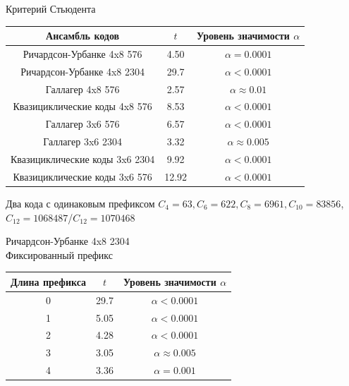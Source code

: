 \documentclass[t,13pt,graphics=pdflatex,xcolor=table,aspectratio=43]{beamer}
\begin{document}
\begin{frame}{Критерий Стьюдента}
\begin{center}
\begin{tabular}{|c|c|c|}
	\hline
	Ансамбль кодов & $t$ & Уровень значимости $\alpha$\\
	\hline
	Ричардсон-Урбанке 4x8 576 & 4.50 &  $\alpha = 0.0001$\\
	\hline
	Ричардсон-Урбанке 4x8 2304 & 29.7 & $\alpha < 0.0001$ \\
	\hline
	Галлагер 4x8 576 & 2.57 & $\alpha \approx 0.01$ \\
	\hline
	Квазициклические коды 4x8 576 & 8.53 & $\alpha < 0.0001$ \\
	\hline
	Галлагер 3x6 576 & 6.57 & $\alpha < 0.0001$ \\
	\hline
	Галлагер 3x6 2304 & 3.32 & $\alpha \approx 0.005$ \\
	\hline
	Квазициклические коды 3x6 2304 & 9.92 & $\alpha < 0.0001$ \\
	\hline
	Квазициклические коды 3x6 576 & 12.92 & $\alpha < 0.0001$ \\
	\hline
\end{tabular}
\end{center}
\end{frame}

\begin{frame}{Два кода с одинаковым префиксом}
$C_4=63, C_6=622, C_8=6961, C_{10}=83856$, $C_{12}=1068487$/$C_{12}=1070468$

\begin{figure}[h!]
\centering
\begin{subfigure}{.5\textwidth}
  \centering
\end{subfigure}%
\begin{subfigure}{.5\textwidth}
  \centering
\end{subfigure}
\end{figure}
\end{frame}

\begin{frame}{Ричардсон-Урбанке 4x8 2304 \\ Фиксированный префикс}
\begin{center}
\begin{tabular}{|c|c|c|}
	\hline
	Длина префикса & $t$ & Уровень значимости $\alpha$\\
	\hline
	0 & 29.7 &  $\alpha < 0.0001$\\
	\hline
	1 & 5.05 &  $\alpha < 0.0001$\\
	\hline
	2 & 4.28 & $\alpha < 0.0001$ \\
	\hline
	3 & 3.05 & $\alpha \approx 0.005$ \\
	\hline
	4 & 3.36 & $\alpha = 0.001$ \\
	\hline
\end{tabular}
\end{center}
\end{frame}
\end{document}
